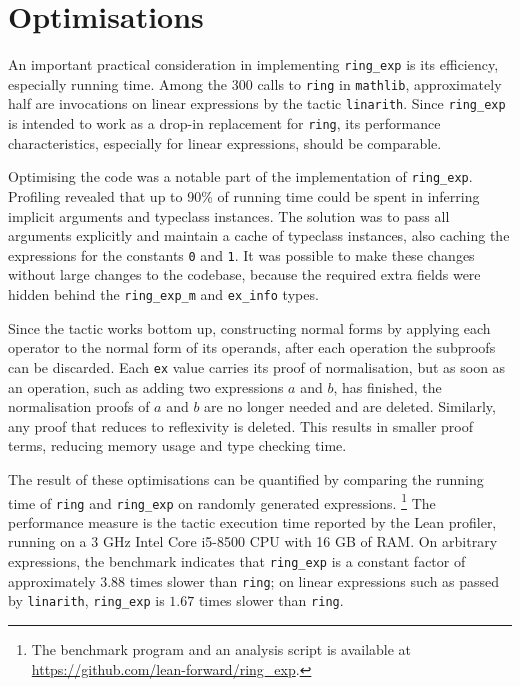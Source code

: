 \documentclass{llncs}
\newcommand{\lean}[1]{\texttt{#1}\xspace} %
\newcommand{\mathlib}{\texttt{mathlib}\xspace}
\newcommand{\ring}{\lean{ring}}
\newcommand{\ringexp}{\lean{ring\_exp}}
\begin{document}
\section{Optimisations}

An important practical consideration in implementing \ringexp is its efficiency, especially running time.
Among the 300 calls to \ring in \mathlib, approximately half are invocations on linear expressions by the tactic \lean{linarith}.
Since \ringexp is intended to work as a drop-in replacement for \lean{ring},
its performance characteristics, especially for linear expressions, should be comparable.

Optimising the code was a notable part of the implementation of \ringexp.
Profiling revealed that up to 90\% of running time could be spent in inferring implicit arguments and typeclass instances.
The solution was to pass all arguments explicitly and maintain a cache of typeclass instances,
also caching the expressions for the constants \lean{0} and \lean{1}.
It was possible to make these changes without large changes to the codebase,
because the required extra fields were hidden behind the \lean{ring\_exp\_m} and \lean{ex\_info} types.

Since the tactic works bottom up,
constructing normal forms by applying each operator to the normal form of its operands,
after each operation the subproofs can be discarded.
Each \lean{ex} value carries its proof of normalisation,
but as soon as an operation, such as adding two expressions $a$ and $b$, has finished,
the normalisation proofs of $a$ and $b$ are no longer needed and are deleted.
Similarly, any proof that reduces to reflexivity is deleted.
This results in smaller proof terms, reducing memory usage and type checking time.


The result of these optimisations can be quantified by comparing the running time of \ring and \ringexp on randomly generated expressions.%
\footnote{The benchmark program and an analysis script is available at \url{https://github.com/lean-forward/ring_exp}.}
The performance measure is the tactic execution time reported by the Lean profiler,
running on a 3 GHz Intel\textregistered\xspace Core\texttrademark\xspace i5-8500 CPU with 16 GB of RAM.
On arbitrary expressions, the benchmark indicates that \ringexp is a constant factor of approximately $3.88$ times slower than \ring;
on linear expressions such as passed by \lean{linarith}, 
\ringexp is $1.67$ times slower than \ring.
\end{document}
